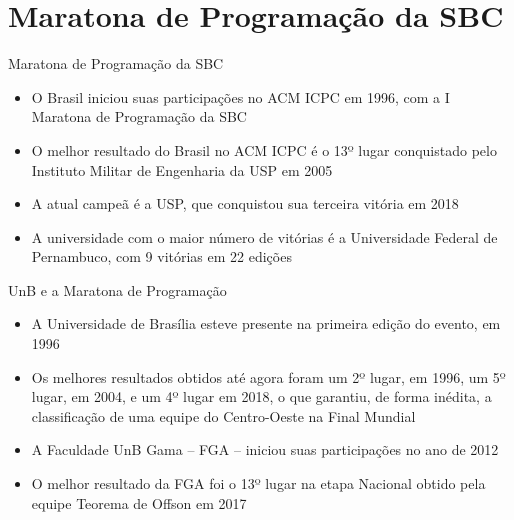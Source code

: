 \section{Maratona de Programação da SBC}

\begin{frame}[fragile]{Maratona de Programação da SBC}

    \begin{itemize}
        \item O Brasil iniciou suas participações no ACM ICPC em 1996, com a I Maratona de
            Programação da SBC
        \item O melhor resultado do Brasil no ACM ICPC é o 13º lugar conquistado pelo 
            Instituto Militar de Engenharia da USP em 2005
        \item A atual campeã é a USP, que conquistou sua terceira vitória em 2018
        \item A universidade com o maior número de vitórias é a Universidade Federal de
            Pernambuco, com 9 vitórias em 22 edições
    \end{itemize}

\end{frame}

\begin{frame}[fragile]{UnB e a Maratona de Programação}

    \begin{itemize}
        \item A Universidade de Brasília esteve presente na primeira edição do evento, em 1996
        \item Os melhores resultados obtidos até agora foram um 2º lugar, em 1996, um 
            5º lugar, em 2004, e um 4º lugar em 2018, o que garantiu, de forma inédita, a
            classificação de uma equipe do Centro-Oeste na Final Mundial
        \item A Faculdade UnB Gama -- FGA -- iniciou suas participações no ano de 2012
        \item O melhor resultado da FGA foi o 13º lugar na etapa Nacional obtido pela equipe 
            Teorema de Offson em 2017
    \end{itemize}

\end{frame}
